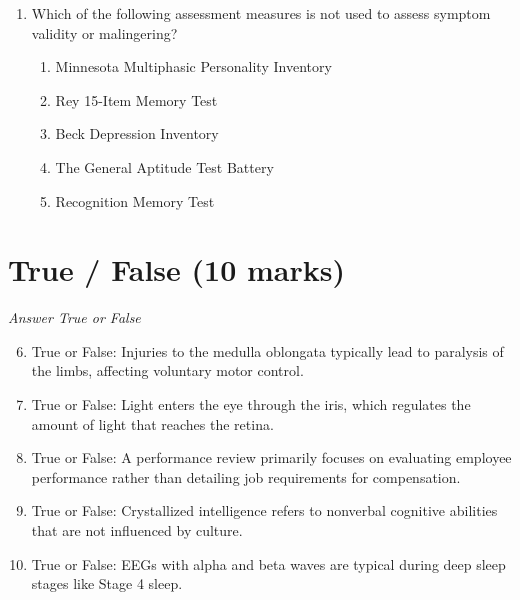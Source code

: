 \documentclass[12pt]{article}
\begin{document}
\begin{enumerate}[label=\arabic*.]
\begin{enumerate}[label=(\alph*)]
    \item aggressive acts can only be predicted by physical characteristics
    \item feelings of anonymity lead to more uncharacteristic violence
    \item aggressive acts increase the likelihood of further aggression
    \item frustration is a prerequisite for any aggressive act
    \item catharsis theory states that high stress levels lead to more aggression
\end{enumerate}
\item Which of the following assessment measures is not used to assess symptom validity or malingering?
\begin{enumerate}[label=(\alph*)]
    \item Minnesota Multiphasic Personality Inventory
    \item Rey 15-Item Memory Test
    \item Beck Depression Inventory
    \item The General Aptitude Test Battery
    \item Recognition Memory Test
\end{enumerate}
\end{enumerate}

\section*{True / False (10 marks)}
\textit{Answer True or False}
\begin{enumerate}[label=\arabic*.]
\setcounter{enumi}{5}
\item True or False: Injuries to the medulla oblongata typically lead to paralysis of the limbs, affecting voluntary motor control.
\item True or False: Light enters the eye through the iris, which regulates the amount of light that reaches the retina.
\item True or False: A performance review primarily focuses on evaluating employee performance rather than detailing job requirements for compensation.
\item True or False: Crystallized intelligence refers to nonverbal cognitive abilities that are not influenced by culture.
\item True or False: EEGs with alpha and beta waves are typical during deep sleep stages like Stage 4 sleep.
\end{enumerate}
\end{document}
